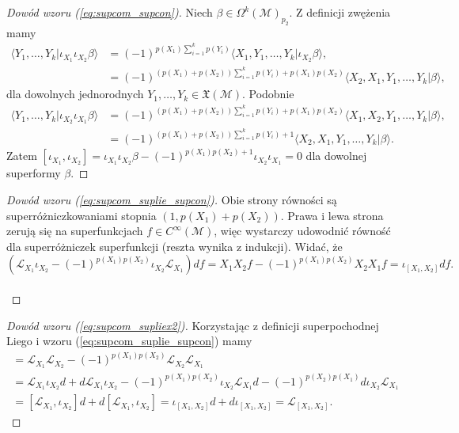 \documentclass[11pt,a4paper]{report}
\theoremstyle{definition}
\begin{document}
\begin{proof}[Dowód wzoru (\ref{eq:supcom_supcon})]
Niech $\beta\in \Omega^k (\mathcal{M})_{p_2}$. Z definicji zwężenia mamy
\begin{equation*}
\begin{aligned}
\langle Y_1,\ldots,Y_k|\iota_{X_1}\iota_{X_2}\beta\rangle&=(-1)^{p(X_1)\sum_{i=1}^k p(Y_i)}\langle X_1,Y_1,\ldots,Y_k|\iota_{X_2}\beta\rangle,\\
&=(-1)^{(p(X_1)+p(X_2))\sum_{i=1}^kp(Y_i)+p(X_1)p(X_2)}\langle X_2,X_1,Y_1,\ldots,Y_k|\beta\rangle,
\end{aligned}
\end{equation*}
dla dowolnych jednorodnych $Y_1, \ldots, Y_k \in \mathfrak{X}(\mathcal{M})$. Podobnie
\begin{equation*}
\begin{aligned}
\langle Y_1,\ldots,Y_k | \iota_{X_2}\iota_{X_1}\beta\rangle & = (-1)^{(p(X_1)+p(X_2)) \sum_{i=1}^k p(Y_i)+p(X_1)p(X_2)}\langle X_1,X_2,Y_1,\ldots,Y_k | \beta\rangle,\\
&=(-1)^{(p(X_1)+p(X_2)) \sum_{i=1}^k p(Y_i)+1}\langle X_2,X_1,Y_1,\ldots,Y_k | \beta\rangle.
\end{aligned}
\end{equation*}
Zatem $ [\iota_{X_1},\iota_{X_2}]= \iota_{X_1}\iota_{X_2}\beta - (-1)^{p(X_1)p(X_2)+1}\iota_{X_2}\iota_{X_1}=0$ dla dowolnej superformy $\beta$. 
\end{proof}

\begin{proof}[Dowód wzoru (\ref{eq:supcom_suplie_supcon})]
Obie strony równości są superróżniczkowaniami stopnia $(1,p(X_1) + p(X_2))$. Prawa i lewa strona zerują się na superfunkcjach $f \in C^\infty(\mathcal M)$, więc wystarczy udowodnić równość dla superróżniczek superfunkcji (reszta wynika z indukcji). Widać, że
\begin{equation*}
(\mathcal{L}_{X_1}\iota_{X_2}-(-1)^{p(X_1)p(X_2)}\iota_{X_2}\mathcal{L}_{X_1})df=X_1X_2f-(-1)^{p(X_1)p(X_2)}X_2X_1f=\iota_{[X_1,X_2]}df.
\end{equation*}\\[-37pt]
\end{proof}

\begin{proof}[Dowód wzoru (\ref{eq:supcom_supliex2})]
Korzystając z definicji superpochodnej Liego i wzoru (\ref{eq:supcom_suplie_supcon}) mamy
\begin{multline}
[\mathcal{L}_{X_1},\mathcal{L}_{X_2}]= \mathcal{L}_{X_1}\mathcal{L}_{X_2}-(-1)^{p(X_1)p(X_2)}\mathcal{L}_{X_2}\mathcal{L}_{X_1}
\\ =\mathcal{L}_{X_1}\iota_{X_2}d + d\mathcal{L}_{X_1}\iota_{X_2}-(-1)^{p(X_1)p(X_2)}\iota_{X_2}\mathcal{L}_{X_1}d-(-1)^{p(X_2)p(X_1)}d\iota_{X_2}\mathcal{L}_{X_1} \\
= [\mathcal{L}_{X_1},\iota_{X_2}] d+d [\mathcal{L}_{X_1},\iota_{X_2}] = \iota_{[X_1,X_2]} d+d \iota_{[X_1,X_2]} = \mathcal{L}_{[X_1,X_2]}.
\end{multline}
\end{proof}
\end{document}
